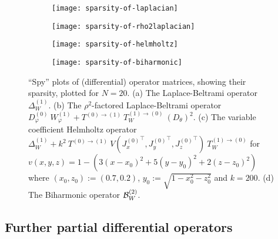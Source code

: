 \begin{figure}[tp]
	\centering %
	\begin{subfigure}{0.5\textwidth}
		\centerline{\texttt{[image: sparsity-of-laplacian]}}
		\centering
		\caption{}
	\end{subfigure}\hfil %
	\begin{subfigure}{0.5\textwidth}
		\centerline{\texttt{[image: sparsity-of-rho2laplacian]}}
		\centering
		\caption{}
	\end{subfigure}\hfil %

	\medskip
	\begin{subfigure}{0.5\textwidth}
		\centerline{\texttt{[image: sparsity-of-helmholtz]}}
		\centering
		\caption{}
	\end{subfigure}\hfil %
	\begin{subfigure}{0.5\textwidth}
		\centerline{\texttt{[image: sparsity-of-biharmonic]}}
		\centering
		\caption{} 
	\end{subfigure}\hfil %
	\caption{\enquote{Spy} plots of (differential) operator matrices, showing their sparsity, plotted for $N = 20$. (a) The Laplace-Beltrami operator $\Delta^{(1)}_W$. (b) The $\rho^2$-factored Laplace-Beltrami operator $D_\varphi^{(0)} \: W_\varphi^{(1)} + T^{(0)\to(1)} \: T_W^{(1)\to(0)} \: (D_\theta)^2$. (c) The variable coefficient Helmholtz operator $\Delta^{(1)}_W + k^2 \: T^{(0)\to(1)} \: V({J_x^{(0)}}^\top, {J_y^{(0)}}^\top, {J_z^{(0)}}^\top) \: T_W^{(1)\to(0)}$ for $v(x,y,z) = 1 - (3(x-x_0)^2 + 5(y-y_0)^2 + 2(z-z_0)^2)$ where $(x_0, z_0) := (0.7, 0.2)$, $y_0 := \sqrt{1 - x_0^2 - z_0^2}$ and $k = 200$. (d) The Biharmonic operator $\mathcal{B}_W^{(2)}$.}
	\label{fig:sc:sparsity}
\end{figure}



\subsection{Further partial differential operators}\label{section:sc:furtherdiffoperators}

